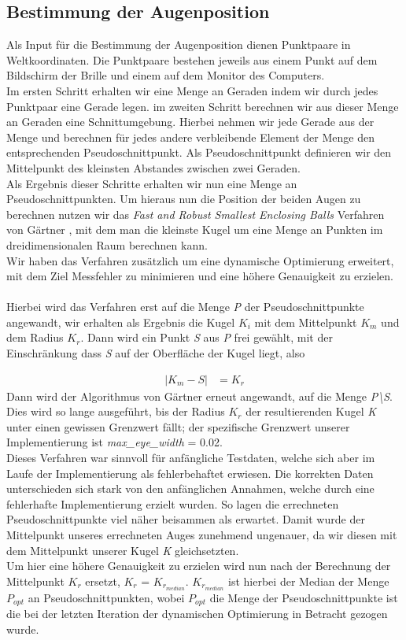 \subsection{Bestimmung der Augenposition}
\label{sec:Augenposition}
Als Input für die Bestimmung der Augenposition dienen Punktpaare in Weltkoordinaten. Die Punktpaare bestehen jeweils aus einem Punkt auf dem Bildschirm der Brille und einem auf dem Monitor des Computers.\\
Im ersten Schritt erhalten wir eine Menge an Geraden indem wir durch jedes Punktpaar eine Gerade legen. im zweiten Schritt berechnen wir aus dieser Menge an Geraden eine Schnittumgebung. Hierbei nehmen wir jede Gerade aus der Menge und berechnen für jedes andere verbleibende Element der Menge den entsprechenden Pseudoschnittpunkt. Als Pseudoschnittpunkt definieren wir den      Mittelpunkt des kleinsten Abstandes zwischen zwei Geraden.\\
Als Ergebnis dieser Schritte erhalten wir nun eine Menge an Pseudoschnittpunkten. Um hieraus nun die Position der beiden Augen zu berechnen nutzen wir das \emph{Fast and Robust Smallest Enclosing Balls} Verfahren von Gärtner \cite{gaertner}, mit dem man die kleinste Kugel um eine Menge an Punkten im dreidimensionalen Raum berechnen kann.\\
Wir haben das Verfahren zusätzlich um eine dynamische Optimierung erweitert, mit dem Ziel
Messfehler zu minimieren und eine höhere Genauigkeit zu erzielen.\\ \\
Hierbei wird das Verfahren erst auf die Menge \emph{P} der Pseudoschnittpunkte angewandt, wir erhalten als Ergebnis die Kugel $K_i$ mit  dem Mittelpunkt $K_m$ und dem Radius $K_r$. Dann wird ein Punkt \emph{S} aus \emph{P} frei gewählt, mit der Einschränkung dass \emph{S} auf der Oberfläche der Kugel liegt, also

\begin{align}
| K_m - S | &= K_r
\end{align} Dann wird der Algorithmus von Gärtner erneut angewandt, auf die Menge \emph{P\textbackslash S}. Dies wird so lange ausgeführt, bis
der Radius $K_r$ der resultierenden Kugel \emph{K} unter einen gewissen Grenzwert fällt; der spezifische Grenzwert unserer Implementierung ist \emph{max\_eye\_width} = 0.02.\\
Dieses Verfahren war sinnvoll für anfängliche Testdaten, welche sich aber im Laufe der Implementierung als fehlerbehaftet erwiesen. Die korrekten Daten unterschieden sich stark von den anfänglichen Annahmen, welche durch eine fehlerhafte Implementierung erzielt wurden. So lagen die errechneten Pseudoschnittpunkte viel näher beisammen als erwartet. Damit wurde der Mittelpunkt unseres errechneten Auges zunehmend ungenauer, da wir diesen mit dem Mittelpunkt
unserer Kugel \emph{K} gleichsetzten.\\
Um hier eine höhere Genauigkeit zu erzielen wird nun nach der Berechnung der Mittelpunkt $K_r$ ersetzt, $K_r$ = $K_{r_{median}}$. $K_{r_{median}}$ ist hierbei der Median der Menge $P_{opt}$ an Pseudoschnittpunkten, wobei $P_{opt}$ die Menge der Pseudoschnittpunkte ist die bei der letzten Iteration der dynamischen Optimierung in Betracht gezogen wurde.\\


